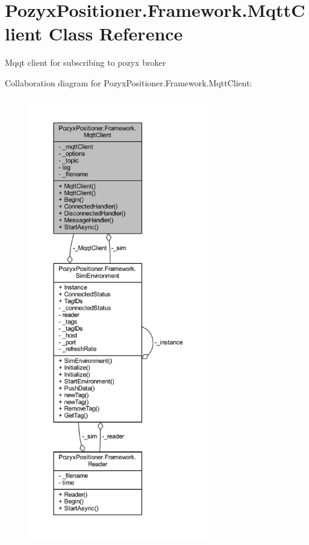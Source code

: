 \hypertarget{class_pozyx_positioner_1_1_framework_1_1_mqtt_client}{}\section{Pozyx\+Positioner.\+Framework.\+Mqtt\+Client Class Reference}
\label{class_pozyx_positioner_1_1_framework_1_1_mqtt_client}


Mqqt client for subscribing to pozyx broker  




Collaboration diagram for Pozyx\+Positioner.\+Framework.\+Mqtt\+Client\+:
\nopagebreak
\begin{figure}[H]
\begin{center}
\leavevmode
\includegraphics[height=550pt]{class_pozyx_positioner_1_1_framework_1_1_mqtt_client__coll__graph}
\end{center}
\end{figure}
